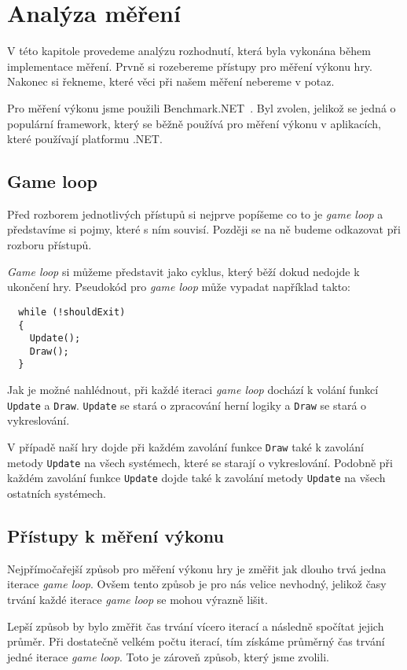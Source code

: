 \chapter{Analýza měření}
V této kapitole provedeme analýzu rozhodnutí, která byla vykonána během implementace měření. Prvně si rozebereme přístupy pro měření výkonu hry. Nakonec si řekneme, které věci při našem měření nebereme v potaz.

Pro měření výkonu jsme použili Benchmark.NET~\cite{BenchmarkDotNet}. Byl zvolen, jelikož se jedná o populární framework, který se běžně používá pro měření výkonu v aplikacích, které používají platformu .NET.

\section{Game loop}
Před rozborem jednotlivých přístupů si nejprve popíšeme co to je \textit{game loop} a představíme si pojmy, které s ním souvisí. Později se na ně budeme odkazovat při rozboru přístupů.

\textit{Game loop} si můžeme představit jako cyklus, který běží dokud nedojde k ukončení hry. Pseudokód pro \textit{game loop} může vypadat například takto:

\begin{verbatim}
  while (!shouldExit) 
  {
    Update();
    Draw();
  }
\end{verbatim}

Jak je možné nahlédnout, při každé iteraci \textit{game loop} dochází k volání funkcí \texttt{Update} a  \texttt{Draw}. \texttt{Update} se stará o zpracování herní logiky a \texttt{Draw} se stará o vykreslování.

V případě naší hry dojde při každém zavolání funkce \texttt{Draw} také k zavolání metody \texttt{Update} na všech systémech, které se starají o vykreslování. Podobně při každém zavolání funkce \texttt{Update} dojde také k zavolání metody \texttt{Update} na všech ostatních systémech.

\section{Přístupy k měření výkonu}
\label{sec:performance-measurements}
Nejpřímočařejší způsob pro měření výkonu hry je změřit jak dlouho trvá jedna iterace \textit{game loop}. Ovšem tento způsob je pro nás velice nevhodný, jelikož časy trvání každé iterace \textit{game loop} se mohou výrazně lišit.

Lepší způsob by bylo změřit čas trvání vícero iterací a následně spočítat jejich průměr. Při dostatečně velkém počtu iterací, tím získáme průměrný čas trvání jedné iterace \textit{game loop}. Toto je zároveň způsob, který jsme zvolili.

